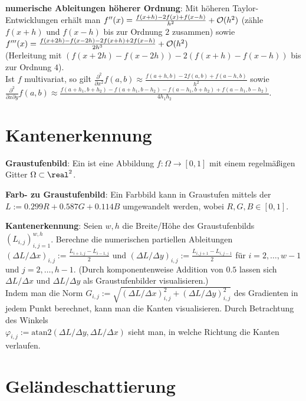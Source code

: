 \linie

\textbf{numerische Ableitungen höherer Ordnung}:
Mit höheren Taylor-Entwicklungen erhält man
$f''(x) = \frac{f(x + h) - 2f(x) + f(x - h)}{h^2} + \mathcal{O}(h^2)$
(zähle $f(x + h)$ und $f(x - h)$ bis zur Ordnung $2$ zusammen) sowie
$f'''(x) = \frac{f(x + 2h) - f(x - 2h) - 2f(x + h) + 2f(x - h)}{2h^3} + \mathcal{O}(h^2)$\\
(Herleitung mit $(f(x+2h)-f(x-2h))-2(f(x+h)-f(x-h))$ bis zur Ordnung $4$).\\
Ist $f$ multivariat, so gilt
$\frac{\partial^2}{\partial x^2} f(a, b) \approx \frac{f(a+h, b) - 2f(a, b) + f(a-h, b)}{h^2}$
sowie\\
$\frac{\partial^2}{\partial x \partial y} f(a, b) \approx
\frac{f(a+h_1, b+h_2) - f(a+h_1, b-h_2) - f(a-h_1, b+h_2) + f(a-h_1, b-h_2)}{4h_1h_2}$.

\pagebreak

\section{%
    Kantenerkennung%
}

\textbf{Graustufenbild}:
Ein  ist eine Abbildung $f\colon \Omega \to [0, 1]$ mit
einem regelmäßigen Gitter $\Omega \subset \real^2$.

\textbf{Farb- zu Graustufenbild}:
Ein Farbbild kann in Graustufen mittels der 
$L := 0.299R + 0.587G + 0.114B$ umgewandelt werden,
wobei $R, G, B \in [0, 1]$.

\linie

\textbf{Kantenerkennung}:
Seien $w, h$ die Breite/Höhe des Graustufenbilds $(L_{i,j})_{i,j=1}^{w,h}$.
Berechne die numerischen partiellen Ableitungen
$(\Delta L/\Delta x)_{i,j} := \frac{L_{i+1,j} - L_{i-1,j}}{2}$ und
$(\Delta L/\Delta y)_{i,j} := \frac{L_{i,j+1} - L_{i,j-1}}{2}$
für $i = 2, \dotsc, w - 1$ und $j = 2, \dotsc, h - 1$.
(Durch komponentenweise Addition von $0.5$ lassen sich $\Delta L/\Delta x$ und $\Delta L/\Delta y$
als Graustufenbilder visualisieren.)\\
Indem man die Norm
$G_{i,j} := \sqrt{(\Delta L/\Delta x)_{i,j}^2 + (\Delta L/\Delta y)_{i,j}^2}$
des Gradienten in jedem Punkt berechnet, kann man die Kanten visualisieren.
Durch Betrachtung des Winkels\\
$\varphi_{i,j} := \mathrm{atan2}(\Delta L/\Delta y, \Delta L/\Delta x)$
sieht man, in welche Richtung die Kanten verlaufen.

\section{%
    Geländeschattierung%
}

